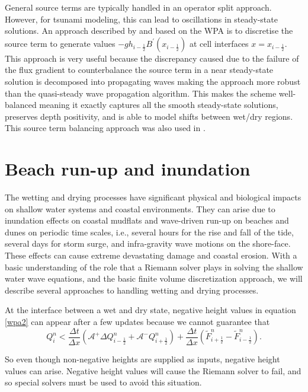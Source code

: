 \documentclass[9pt,a4paper]{article}
\begin{document}
	
	General source terms are typically handled in an operator split approach.  However, for tsunami modeling, this can lead to oscillations in steady-state solutions.  An approach described by  \citet{ba-le-mi-ro:2003} and based on the WPA is to discretise the source term to generate values $-gh_{i-\frac{1}{2}}B^{\prime}(x_{i-\frac{1}{2}})$ at  cell interfaces  $x = x_{i-\frac{1}{2}}$. This approach is very useful because the discrepancy caused due to the failure of the flux gradient to counterbalance the source term in a near steady-state solution is decomposed into propagating waves  making the approach more robust than the quasi-steady wave propagation algorithm.  This makes the scheme well-balanced  meaning it exactly captures all the smooth steady-state solutions, preserves depth positivity, and is able to model shifts between wet/dry regions. This source term balancing approach was also used in  \citet{chaabelasri1849simple}. 
	
	
	\section{Beach run-up and inundation}
	The wetting and drying processes have significant physical and biological impacts on shallow water systems and coastal environments. They can arise due to inundation effects on coastal mudflats and wave-driven run-up on beaches and dunes on periodic time scales, i.e., several hours for the rise and fall of the tide, several days for storm surge, and infra-gravity wave motions on the shore-face.  These effects can cause extreme devastating damage and coastal erosion.
	With a basic understanding of the role that a Riemann solver plays in solving the shallow water wave equations, and the basic finite volume discretization approach, we will describe several approaches to handling wetting and drying processes.  
	
	At the interface between a wet and dry state, negative height values in equation \eqref{wpa2} can appear after a few updates because we cannot guarantee that
	\begin{equation}
		Q_{i}^{n} < \frac{\Delta t}{\Delta x}(\mathcal{A^{+}}\Delta 	Q_{i-\frac{1}{2}}^{n} + \mathcal{A^{-}}Q_{i+\frac{1}{2}}^{n}) + \frac{\Delta t}{\Delta x} (\tilde{F}_{i+\frac{1}{2}}^{n} - \tilde{F}_{i-\frac{1}{2}}^{n} ).
		\label{wpa22}
	\end{equation}
	
	So even though non-negative heights are supplied as inputs, negative height values can arise.  Negative height values will cause the Riemann solver to fail, and so special solvers must be used to avoid this situation.
	
\end{document}
